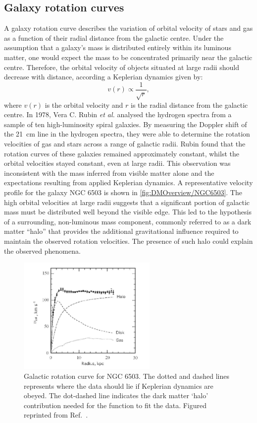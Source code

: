 \subsection{Galaxy rotation curves}\label{sec:DMOverview/RotationCurves}
A galaxy rotation curve describes the variation of orbital velocity of stars and gas as a function of their radial distance from the galactic centre. Under the assumption that a galaxy's mass is distributed entirely within its luminous matter, one would expect the mass to be concentrated primarily near the galactic centre. Therefore, the orbital velocity of objects situated at large radii should decrease with distance, according a Keplerian dynamics given by:
\begin{equation}
v(r) \propto \frac{1}{\sqrt{r}},
\end{equation}
where $v(r)$ is the orbital velocity and $r$ is the radial distance from the galactic centre.
In 1978, Vera C. Rubin \textit{et al.}\cite{Rubin} analysed the hydrogen spectra from a sample of ten high-luminosity spiral galaxies. By measuring the Doppler shift of the 21~cm line in the hydrogen spectra, they were able to determine the rotation velocities of gas and stars across a range of galactic radii. Rubin found that the rotation curves of these galaxies remained approximately constant, whilst the orbital velocities stayed constant, even at large radii. This observation was inconsistent with the mass inferred from visible matter alone and the expectations resulting from applied Keplerian dynamics.
A representative velocity profile for the galaxy NGC 6503 is shown in \autoref{fig:DMOverview/NGC6503}. The high orbital velocities at large radii suggests that a significant portion of galactic mass must be distributed well beyond the visible edge. This led to the hypothesis of a surrounding, non-luminous mass component, commonly referred to as a dark matter ``halo'' that provides the additional gravitational influence required to maintain the observed rotation velocities. The presence of such halo could explain the observed phenomena.
\begin{figure}[ht]
	\centering
	\includegraphics[width = 0.6\textwidth]{figures/DMOverview/NGC_6503.png}
	\caption[Galactic rotation curve for NGC 6503.]{Galactic rotation curve for NGC 6503. The dotted and dashed lines represents where the data should lie if Keplerian dynamics are obeyed. The dot-dashed line indicates the dark matter `halo' contribution needed for the function to fit the data. Figured reprinted from Ref.~\cite{Freese2009}.}
	\label{fig:DMOverview/NGC6503}
\end{figure}
